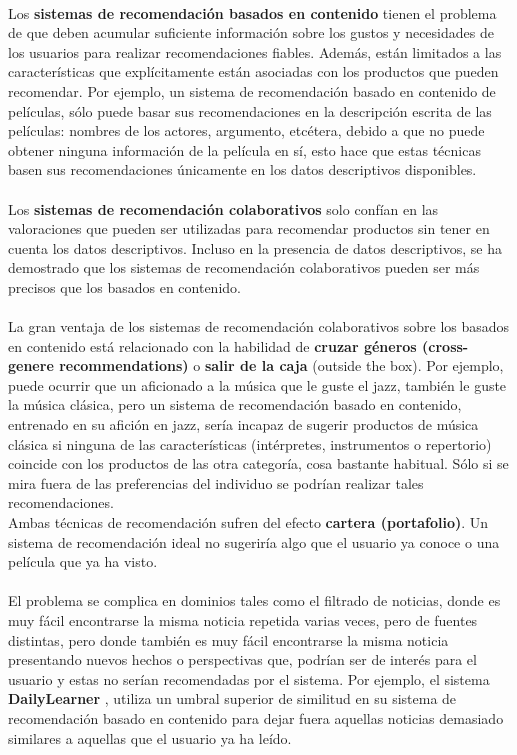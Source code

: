 \documentclass[12pt,letterpaper,oneside] {memoir}
\begin{document}
\paragraph{}
Los \textbf{sistemas de recomendación basados en contenido} tienen el problema de que deben acumular suficiente información sobre los gustos y necesidades de los usuarios para realizar recomendaciones fiables. Además, están limitados a las características que explícitamente están asociadas con los productos que pueden recomendar. Por ejemplo, un sistema de recomendación basado en contenido de películas, sólo puede basar sus recomendaciones en la descripción escrita de las películas: nombres de los actores, argumento, etcétera,  debido a que no puede obtener ninguna información de la película en sí, esto hace que estas técnicas basen sus recomendaciones únicamente en los datos descriptivos disponibles.
\paragraph{}
Los \textbf{sistemas de recomendación colaborativos} solo confían en las valoraciones que pueden ser utilizadas para recomendar productos sin tener en cuenta los datos descriptivos. Incluso en la presencia de datos descriptivos, se ha demostrado que los sistemas de recomendación colaborativos pueden ser más precisos que los basados en contenido.  %
\paragraph{}
La gran ventaja de los sistemas de recomendación colaborativos sobre los basados en contenido está relacionado con la habilidad de \textbf{cruzar géneros (cross-genere recommendations)} o \textbf{salir de la caja} (outside the box). Por ejemplo, puede ocurrir que un aficionado a la música que le guste el jazz, también le guste la música clásica, pero un sistema de recomendación basado en contenido, entrenado en su afición en jazz, sería incapaz de sugerir productos de música clásica si ninguna de las características (intérpretes, instrumentos o repertorio) coincide con los productos de las otra categoría, cosa bastante habitual. Sólo si se mira fuera de las preferencias del individuo se podrían realizar tales recomendaciones.\\
Ambas técnicas de recomendación sufren del efecto \textbf{cartera (portafolio)}. Un sistema de recomendación ideal no sugeriría algo que el usuario ya conoce o una película que ya ha visto.
\paragraph{}
El problema se complica en dominios tales como el filtrado de noticias, donde es muy fácil encontrarse la misma noticia repetida varias veces, pero de fuentes distintas, pero donde también es muy fácil encontrarse la misma noticia presentando nuevos hechos o perspectivas que, podrían ser de interés para el usuario y estas no serían recomendadas por el sistema. Por ejemplo, el sistema \textbf{DailyLearner} \citep{Billsus2000}, utiliza un umbral superior de similitud en su sistema de recomendación basado en contenido para dejar fuera aquellas noticias demasiado similares a aquellas que el usuario ya ha leído.
\end{document}
